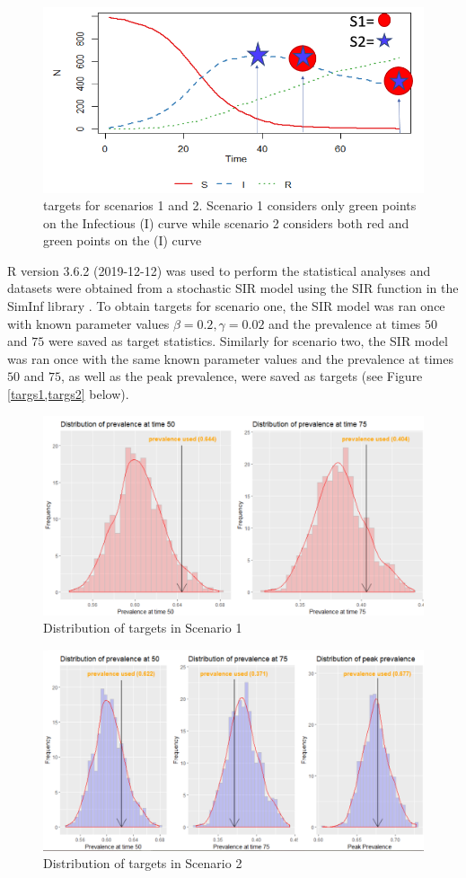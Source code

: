 \begin{figure}[h!]
	\includegraphics[width=\linewidth]{targets.png}
	\caption{targets for scenarios 1 and 2. Scenario 1 considers only green points on the     Infectious (I) curve while scenario 2 considers both red and green points on the (I) curve}
	\label{targets}
\end{figure}

R version 3.6.2 (2019-12-12) was used to perform the statistical analyses and datasets were obtained from a stochastic SIR model using the SIR function in the SimInf library \cite{siminf}. To obtain targets for scenario one, the SIR model was ran once with known parameter values $\beta = 0.2, \gamma = 0.02$ and the prevalence at times $50$ and $75$ were saved as target statistics. Similarly for scenario two, the SIR model was ran once with the same known parameter values and the prevalence at times $50$ and $75$, as well as the peak prevalence, were saved as targets (see Figure \ref{targs1,targs2} below).


\begin{figure}[h!]
	\includegraphics[width=\linewidth]{targ_dist_S1.png}
	\caption{Distribution of targets in Scenario 1 }
	\label{targs1}
\end{figure}


\begin{figure}[h!]
	\includegraphics[width=\linewidth]{targ_dist_S2.png}
	\caption{Distribution of targets in Scenario 2 }
	\label{targs2}
\end{figure}
